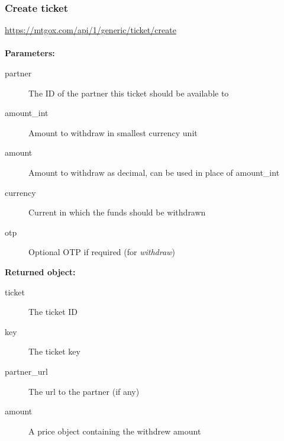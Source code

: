 \documentclass[a4paper,12pt]{article}
\begin{document}
\subsubsection{Create ticket}

\url{https://mtgox.com/api/1/generic/ticket/create}
\\
\\
\textbf{Parameters:}

\begin{description}
\item[partner] The ID of the partner this ticket should be available to
\item[amount\_int] Amount to withdraw in smallest currency unit
\item[amount] Amount to withdraw as decimal, can be used in place of amount\_int
\item[currency] Current in which the funds should be withdrawn
\item[otp] Optional OTP if required (for \emph{withdraw})
\end{description}

\textbf{Returned object:}

\begin{description}
\item[ticket] The ticket ID
\item[key] The ticket key
\item[partner\_url] The url to the partner (if any)
\item[amount] A price object containing the withdrew amount
\end{description}
\end{document}

